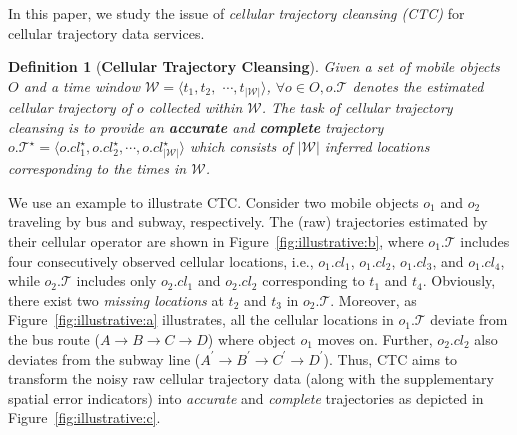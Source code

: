 \documentclass{vldb}
\newtheorem{definition}{Definition}
\begin{document}
	
	
	In this paper, we study the issue of {\em cellular trajectory cleansing (CTC)} for cellular trajectory data services. 
	\begin{definition} [{\bf Cellular Trajectory Cleansing}] Given a set of mobile objects $O$ and a time window $\mathcal{W}=\langle t_1,t_2,$ $\cdots,t_{|\mathcal{W}|} \rangle$, $\forall o \in O, o.\mathcal{T}$ denotes the estimated cellular trajectory of $o$ collected within $\mathcal{W}$. The task of cellular trajectory cleansing is to provide an {\bf\em accurate} and {\bf\em complete} trajectory $o.\mathcal{T}^\star=\langle o.cl_1^\star, o.cl_2^\star, \cdots, o.cl_{|\mathcal{W}|}^\star\rangle$ which consists of $|\mathcal{W}|$ inferred locations corresponding to the times in $\mathcal{W}$. 
	\end{definition}
	
	We use an example to illustrate CTC. Consider two mobile objects $o_1$ and $o_2$ traveling by bus and subway, respectively. The (raw) trajectories estimated by their cellular operator are shown in Figure~\ref{fig:illustrative:b}, where $o_1.\mathcal{T}$ includes four consecutively observed cellular locations, i.e., $o_1.cl_1$, $o_1.cl_2$, $o_1.cl_3$, and $o_1.cl_4$, while $o_2.\mathcal{T}$ includes only $o_2.cl_1$ and $o_2.cl_2$ corresponding to $t_1$ and $t_4$. Obviously, there exist two {\em missing locations} at $t_2$ and $t_3$ in $o_2.\mathcal{T}$. Moreover, as Figure~\ref{fig:illustrative:a} illustrates, all the cellular locations in $o_1.\mathcal{T}$ deviate from the bus route ($A\rightarrow B\rightarrow C\rightarrow D$) where object $o_1$ moves on. Further, $o_2.cl_2$ also deviates from the subway line ($A^\prime\rightarrow B^\prime\rightarrow C^\prime\rightarrow D^\prime$). Thus, CTC aims to transform the noisy raw cellular trajectory data (along with the supplementary spatial error indicators) into {\em accurate} and {\em complete} trajectories as depicted in Figure~\ref{fig:illustrative:c}. 
	
\end{document}
